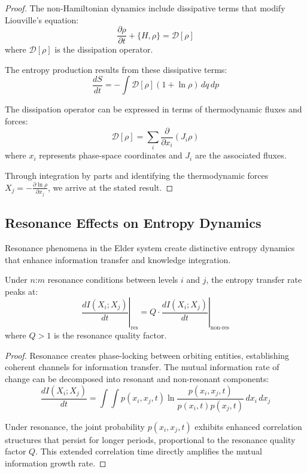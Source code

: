 \begin{proof}
The non-Hamiltonian dynamics include dissipative terms that modify Liouville's equation:
\begin{equation}
\frac{\partial \rho}{\partial t} + \{H, \rho\} = \mathcal{D}[\rho]
\end{equation}
where $\mathcal{D}[\rho]$ is the dissipation operator.

The entropy production results from these dissipative terms:
\begin{equation}
\frac{dS}{dt} = -\int \mathcal{D}[\rho] (1 + \ln \rho) \, dq \, dp
\end{equation}

The dissipation operator can be expressed in terms of thermodynamic fluxes and forces:
\begin{equation}
\mathcal{D}[\rho] = \sum_i \frac{\partial}{\partial x_i} (J_i \rho)
\end{equation}
where $x_i$ represents phase-space coordinates and $J_i$ are the associated fluxes.

Through integration by parts and identifying the thermodynamic forces $X_j = -\frac{\partial \ln \rho}{\partial x_j}$, we arrive at the stated result.
\end{proof}

\subsection{Resonance Effects on Entropy Dynamics}

Resonance phenomena in the Elder system create distinctive entropy dynamics that enhance information transfer and knowledge integration.

\begin{theorem}
Under $n$:$m$ resonance conditions between levels $i$ and $j$, the entropy transfer rate peaks at:
\begin{equation}
\left.\frac{dI(X_i; X_j)}{dt}\right|_{\text{res}} = Q \cdot \left.\frac{dI(X_i; X_j)}{dt}\right|_{\text{non-res}}
\end{equation}
where $Q > 1$ is the resonance quality factor.
\end{theorem}

\begin{proof}
Resonance creates phase-locking between orbiting entities, establishing coherent channels for information transfer. The mutual information rate of change can be decomposed into resonant and non-resonant components:
\begin{equation}
\frac{dI(X_i; X_j)}{dt} = \int\int p(x_i, x_j, t) \ln\frac{p(x_i, x_j, t)}{p(x_i, t)p(x_j, t)} \, dx_i \, dx_j
\end{equation}

Under resonance, the joint probability $p(x_i, x_j, t)$ exhibits enhanced correlation structures that persist for longer periods, proportional to the resonance quality factor $Q$. This extended correlation time directly amplifies the mutual information growth rate.
\end{proof}

